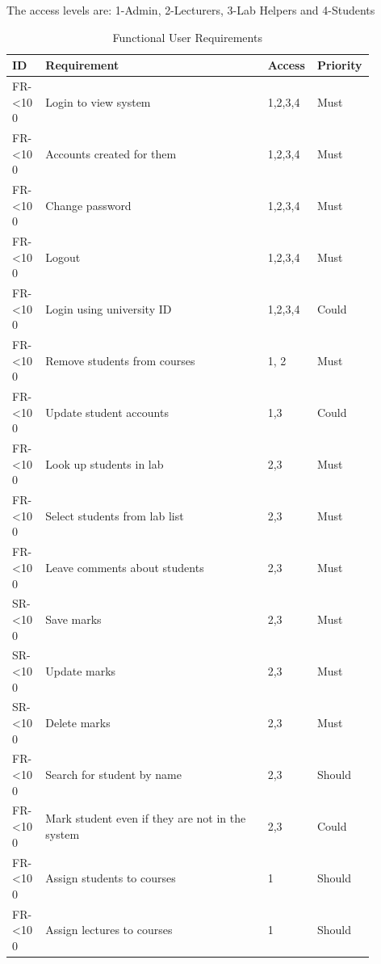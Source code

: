 \documentclass[11pt]{report}
\newcommand{\rid}[1]{\centering #1-\ifnum\value{requirement}<10 0\fi\arabic{requirement}
\stepcounter{requirement}}
\begin{document}
The access levels are: 1-Admin, 2-Lecturers, 3-Lab Helpers and 4-Students

\begin{spacing}{1.2}
\begin{longtable}{|p{0.09\linewidth}|p{0.6\linewidth}|p{0.1\linewidth}|
p{0.1\linewidth}|}
\caption{Functional User Requirements} \label{table:funct-user} \\ \hline
\textbf{ID} & \textbf{Requirement} & \textbf{Access} & \textbf{Priority}\\
\hline \hline

\rid{FR} &  Login to view system & 1,2,3,4 & Must\\ \hline
\rid{FR} &  Accounts created for them & 1,2,3,4 & Must\\ \hline
\rid{FR} &  Change password & 1,2,3,4 & Must\\ \hline
\rid{FR} &  Logout & 1,2,3,4 & Must \\ \hline
\rid{FR} &  Login using university ID & 1,2,3,4 & Could\\ \hline

\rid{FR} &  Remove students from courses & 1, 2 & Must\\ \hline
\rid{FR} &  Update student accounts & 1,3 & Could \\ \hline

\rid{FR} &  Look up students in lab & 2,3 & Must\\ \hline
\rid{FR} &  Select students from lab list & 2,3 & Must\\ \hline
\rid{FR} &  Leave comments about students & 2,3 & Must\\ \hline
\rid{SR} &  Save marks & 2,3 & Must\\ \hline
\rid{SR} &  Update marks & 2,3 & Must\\ \hline
\rid{SR} &  Delete marks & 2,3 & Must\\ \hline
\rid{FR} &  Search for student by name & 2,3 & Should\\ \hline
\rid{FR} &  Mark student even if they are not in the system & 2,3 & Could \\ \hline

\rid{FR} &  Assign students to courses & 1 & Should\\ \hline
\rid{FR} &  Assign lectures to courses & 1 & Should\\ \hline


\end{longtable}
\end{spacing}
\end{document}
